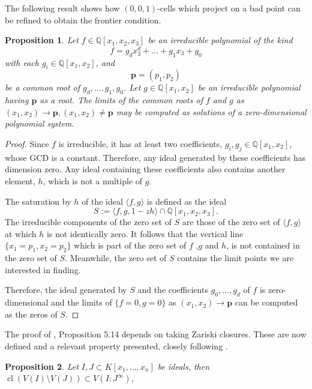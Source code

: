 \documentclass[
]{book}
\newtheorem{proposition}{Proposition}[chapter]
\theoremstyle{definition}
\theoremstyle{definition}
\theoremstyle{definition}
\theoremstyle{definition}
\theoremstyle{remark}
\begin{document}
The following result shows how \((0,0,1)\)-cells which project on a bad point can be refined to obtain the frontier condition.

\begin{proposition}
\protect\hypertarget{prp:lazard-5-14}{}\label{prp:lazard-5-14}\citep[Proposition 5.14]{lazard10}
Let \(f \in \mathbb{Q}[x_1,x_2,x_3]\) be an irreducible polynomial of the kind
\[f = g_dx_3^d + \ldots + g_1x_3 + g_0\]
with each \(g_i \in \mathbb{Q}[x_1,x_2]\), and
\[\mathbf{p} = (p_1,p_2)\]
be a common root of \(g_d,\ldots,g_1,g_0\).
Let \(g\in \mathbb{Q}[x_1,x_2]\) be an irreducible polynomial having \(\mathbf{p}\) as a root.
The limits of the common roots of \(f\) and \(g\) as \((x_1, x_2) \to \mathbf{p}, (x_1, x_2) \ne \mathbf{p}\) may be computed as solutions of a zero-dimensional
polynomial system.
\end{proposition}

\begin{proof}
Since \(f\) is irreducible, it has at least two coefficients, \(g_i,g_j \in \mathbb{Q}[x_1,x_2]\), whose GCD is a constant.
Therefore, any ideal generated by these coefficients has dimension zero. Any ideal containing these coefficients also contains another element, \(h\), which is not a multiple of \(g\).

The saturation by \(h\) of the ideal \(\langle f,g \rangle\) is defined as the ideal
\[
S := \langle f, g, 1 - zh \rangle \cap \mathbb{Q}[x_1,x_2,x_3].
\]
The irreducible components of the zero set of \(S\) are those of the zero set of \(\langle f,g \rangle\) at which \(h\) is not identically zero. It follows that the vertical line \(\{ x_1 = p_1, x_2 = p_2 \}\) which is part of the zero set of \(f\) ,\(g\) and \(h\), is not contained in the zero set of \(S\). Meanwhile, the zero set of \(S\) contains the limit points we are interested in finding.

Therefore, the ideal generated by \(S\) and the coefficients \(g_0,\ldots,g_d\) of \(f\) is zero-dimensional and the limits of \(\{ f=0,g=0 \}\) as \((x_1,x_2) \to \mathbf{p}\) can be computed as the zeros of \(S\).
\end{proof}

The proof of \citet{lazard10}, Proposition 5.14 depends on taking Zariski closures. These are now defined and a relevant property presented, closely following \citet{cox2013}.

\begin{proposition}
\protect\hypertarget{prp:cox-zariski}{}\label{prp:cox-zariski}\citep[ p203, part of Theorem 10]{cox2013}
Let \(I,J \subset K[x_1,\ldots,x_n]\) be ideals, then
\({\operatorname{cl} \left(  V(I) \setminus V(J)  \right)} \subset V(I : J^\infty)\),
\end{proposition}
\end{document}
